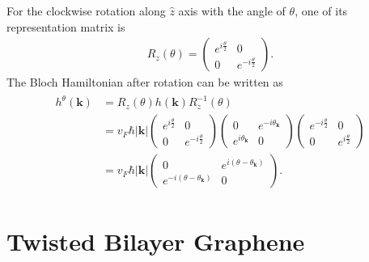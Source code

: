 \documentclass[10pt, oneside]{article}
\newcommand{\te}{\theta}
\newcommand{\p}[1]{\left(#1\right)}
\begin{document}
For the clockwise rotation along $\hat{z}$ axis with the angle of $\theta$, one of its representation matrix is 
\begin{align}
	R_{z} \p{\te} = \begin{pmatrix}
		e^{i \frac{\te}{2}} & 0 \\
		0 & e^{ - i \frac{\te}{2}}
	\end{pmatrix}.
\end{align}
The Bloch Hamiltonian after rotation can be written as
\begin{align}
	\begin{split}
		h^{\te} \p{\bm{k}} &= R_{z} \p{\te} h \p{\bm{k}} R^{-1}_{z} \p{\te} \\
		& = v_F \hbar |\bm{k}| \begin{pmatrix}
			e^{i \frac{\te}{2}} & 0 \\
			0 & e^{ - i \frac{\te}{2}}
		\end{pmatrix} \begin{pmatrix}
			0 & e^{-i \te_{\bm{k}}} \\
			e^{i \te_{\bm{k}}} & 0
		\end{pmatrix}  \begin{pmatrix}
		e^{-i \frac{\te}{2}} & 0 \\
		0 & e^{ i \frac{\te}{2}}
	\end{pmatrix} \\
	& =  v_F \hbar |\bm{k}| \begin{pmatrix}
		0 & e^{i \p{\te - \te_{\bm{k}}}} \\
		e^{ - i \p{\te - \te_{\bm{k}}}} & 0
	\end{pmatrix}.
	\end{split}
\end{align}

\section{Twisted Bilayer Graphene}
\end{document}
